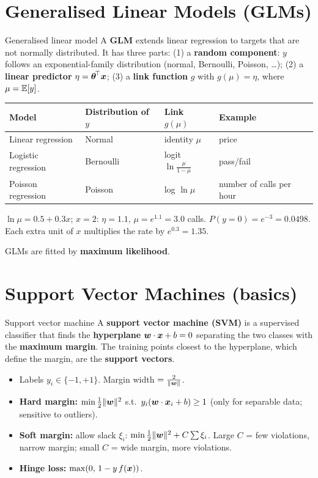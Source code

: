 \section{Generalised Linear Models (GLMs)}
\begin{dfn}{Generalised linear model}
A \textbf{GLM} extends linear regression to targets that are not normally distributed. It has three parts: (1) a \textbf{random component}: $y$ follows an exponential-family distribution (normal, Bernoulli, Poisson, \dots); (2) a \textbf{linear predictor} $\eta=\boldsymbol{\theta}^{\!\top}\boldsymbol{x}$; (3) a \textbf{link function} $g$ with $g(\mu)=\eta$, where $\mu=\mathbb{E}[y]$.
\end{dfn}
\begin{center}
\small
\begin{tabular}{@{}llll@{}}
\toprule
\textbf{Model} & \textbf{Distribution of $y$} & \textbf{Link $g(\mu)$} & \textbf{Example}\\
\midrule
Linear regression & Normal & identity $\mu$ & price\\
Logistic regression & Bernoulli & logit $\ln\frac\mu{1-\mu}$ & pass/fail\\
Poisson regression & Poisson & log $\ln\mu$ & number of calls per hour\\
\bottomrule
\end{tabular}
\end{center}
\begin{numer}
$\ln\mu=0.5+0.3x$; $x=2$: $\eta=1.1$, $\mu=e^{1.1}=3.0$ calls. $P(y=0)=e^{-3}=0.0498$. Each extra unit of $x$ multiplies the rate by $e^{0.3}=1.35$.
\end{numer}
GLMs are fitted by \textbf{maximum likelihood}.

\section{Support Vector Machines (basics)}
\begin{dfn}{Support vector machine}
A \textbf{support vector machine (SVM)} is a supervised classifier that finds the \textbf{hyperplane} $\boldsymbol{w}\cdot\boldsymbol{x}+b=0$ separating the two classes with the \textbf{maximum margin}. The training points closest to the hyperplane, which define the margin, are the \textbf{support vectors}.
\end{dfn}
\begin{itemize}
  \item Labels $y_i\in\{-1,+1\}$. Margin width $=\frac2{\|\boldsymbol{w}\|}$.
  \item \textbf{Hard margin:} $\min\frac12\|\boldsymbol{w}\|^2$ s.t.\ $y_i(\boldsymbol{w}\cdot\boldsymbol{x}_i+b)\ge1$ (only for separable data; sensitive to outliers).
  \item \textbf{Soft margin:} allow slack $\xi_i$: $\min\frac12\|\boldsymbol{w}\|^2+C\sum\xi_i$. Large $C$ = few violations, narrow margin; small $C$ = wide margin, more violations.
  \item \textbf{Hinge loss:} $\max(0,\,1-y\,f(\boldsymbol{x}))$.
\end{itemize}

